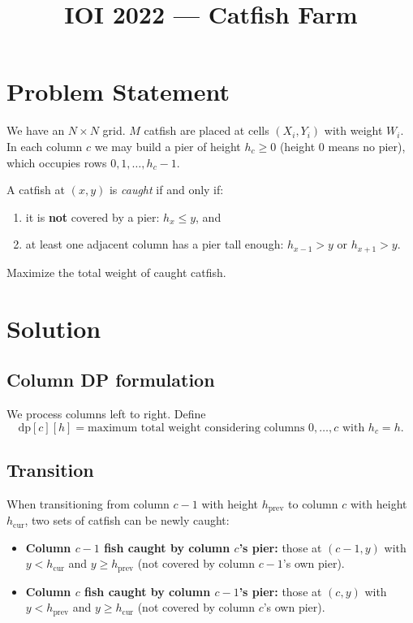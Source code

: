 \documentclass[11pt,a4paper]{article}
\title{IOI 2022 --- Catfish Farm}
\author{}
\date{}
\begin{document}
\maketitle

\section{Problem Statement}

We have an $N \times N$ grid.  $M$ catfish are placed at cells $(X_i, Y_i)$ with
weight $W_i$.  In each column $c$ we may build a pier of height $h_c \ge 0$
(height 0 means no pier), which occupies rows $0, 1, \ldots, h_c - 1$.

A catfish at $(x, y)$ is \emph{caught} if and only if:
\begin{enumerate}
  \item it is \textbf{not} covered by a pier: $h_x \le y$, and
  \item at least one adjacent column has a pier tall enough:
        $h_{x-1} > y$ or $h_{x+1} > y$.
\end{enumerate}
Maximize the total weight of caught catfish.

\section{Solution}

\subsection{Column DP formulation}

We process columns left to right.  Define
\[
  \mathrm{dp}[c][h] = \text{maximum total weight considering columns } 0,\ldots,c
  \text{ with } h_c = h.
\]

\subsection{Transition}

When transitioning from column $c-1$ with height $h_{\mathrm{prev}}$ to column
$c$ with height $h_{\mathrm{cur}}$, two sets of catfish can be newly caught:

\begin{itemize}
  \item \textbf{Column $c{-}1$ fish caught by column $c$'s pier:}
        those at $(c{-}1, y)$ with $y < h_{\mathrm{cur}}$ and $y \ge h_{\mathrm{prev}}$
        (not covered by column $c{-}1$'s own pier).
  \item \textbf{Column $c$ fish caught by column $c{-}1$'s pier:}
        those at $(c, y)$ with $y < h_{\mathrm{prev}}$ and $y \ge h_{\mathrm{cur}}$
        (not covered by column $c$'s own pier).
\end{itemize}
\end{document}
